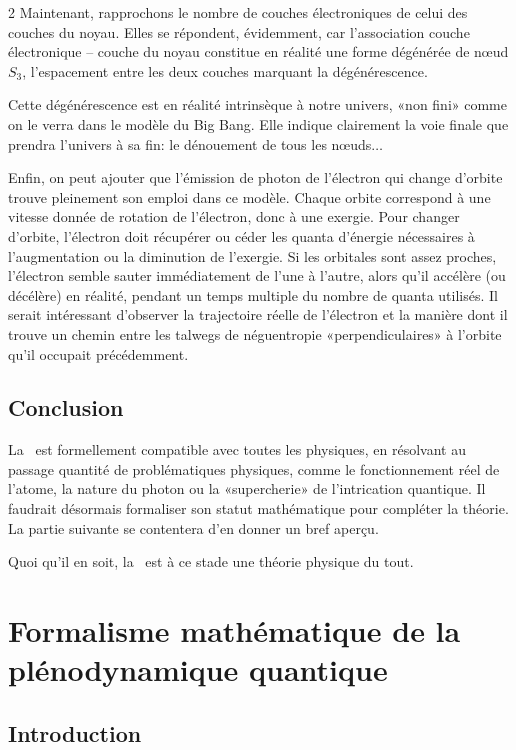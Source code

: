 \begin{multicols}{2}
Maintenant, rapprochons le nombre de couches électroniques de celui
des couches du noyau. Elles se répondent, évidemment, car l'association
couche électronique -- couche du noyau constitue en réalité une forme
dégénérée de nœud $S_3$, l'espacement entre les deux couches marquant la
dégénérescence.

Cette dégénérescence est en réalité intrinsèque à notre univers, «non
fini» comme on le verra dans le modèle du Big Bang. Elle indique
clairement la voie finale que prendra l'univers à sa fin: le dénouement
de tous les nœuds$\ldots$

Enfin, on peut ajouter que l'émission de photon de l'électron qui
change d'orbite trouve pleinement son emploi dans ce modèle. Chaque
orbite correspond à une vitesse donnée de rotation de l'électron, donc
à une exergie. Pour changer d'orbite, l'électron doit récupérer ou
céder les quanta d'énergie nécessaires à l'augmentation ou la
diminution de l'exergie. Si les orbitales sont assez proches,
l'électron semble sauter immédiatement de l'une à l'autre, alors qu'il
accélère (ou décélère) en réalité, pendant un temps multiple du nombre
de quanta utilisés. Il serait intéressant d'observer la trajectoire
réelle de l'électron et la manière dont il trouve un chemin entre les
talwegs de néguentropie «perpendiculaires» à l'orbite qu'il occupait
précédemment.

\subsection{Conclusion}

La \PQ\ est formellement compatible avec toutes les physiques, en résolvant
au passage quantité de problématiques physiques, comme le fonctionnement réel
de l'atome, la nature du photon ou la «supercherie» de l'intrication
quantique. Il faudrait désormais formaliser son statut mathématique
pour compléter la théorie. La partie suivante se contentera d'en
donner un bref aperçu.

Quoi qu'il en soit, la \PQ\ est à ce stade une théorie physique du tout.

\section{Formalisme mathématique de la plénodynamique quantique}

\subsection{Introduction}


\end{multicols}
